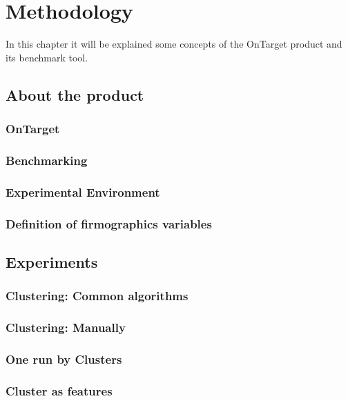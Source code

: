 \chapter{Methodology}
\label{ch:methodology}

In this chapter it will be explained some concepts of the OnTarget product and its benchmark tool.

\section{About the product}

\subsection{OnTarget}

\subsection{Benchmarking}

\subsection{Experimental Environment}

\subsection{Definition of firmographics variables}

\section{Experiments}

\subsection{Clustering: Common algorithms}

\subsection{Clustering: Manually}

\subsection{One run by Clusters}

\subsection{Cluster as features}
